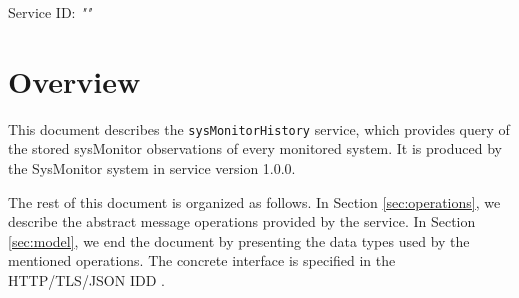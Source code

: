 \documentclass[a4paper]{arrowhead}
\begin{document}
\sloppy

\ArrowheadSetup

\begin{center}
  \vspace*{1cm}
  \huge{\arrowtitle}

  \vspace*{0.2cm}
  \LARGE{\arrowtype}
  \vspace*{1cm}

  \Large{Service ID: \textit{"\arrowid"}}

  \vspace*{\fill}


  \vspace*{1cm}
  \vspace*{\fill}

  \begin{abstract}
    This document describes the \texttt{sysMonitorHistory} service, version 1.0.0, produced by the SysMonitor support system of Arrowhead 5.2.2.
  \end{abstract}

  \vspace*{1cm}
\end{center}

\newpage

\tableofcontents
\newpage

\section{Overview}
\label{sec:overview}

This document describes the \texttt{sysMonitorHistory} service, which provides query of the stored sysMonitor observations of every monitored system.
It is produced by the SysMonitor system \cite{smo-sysd} in service version 1.0.0.

The rest of this document is organized as follows.
In Section \ref{sec:operations}, we describe the abstract message operations provided by the service.
In Section \ref{sec:model}, we end the document by presenting the data types used by the mentioned operations.
The concrete interface is specified in the HTTP/TLS/JSON IDD \cite{smo-sysMonitorHistory-http-idd}.
\end{document}
